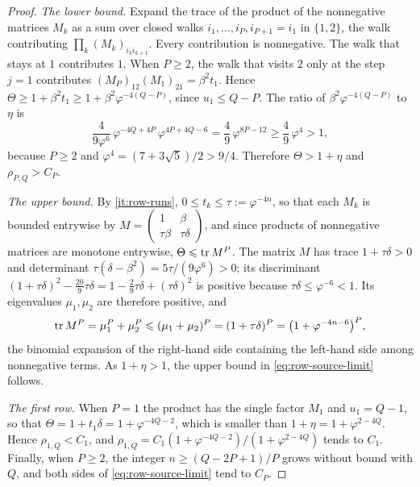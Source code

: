 \begin{proof}
\emph{The lower bound.} Expand the trace of the product of the
nonnegative matrices $M_k$ as a sum over closed walks
$i_1,\dots,i_P,i_{P+1}=i_1$ in $\{1,2\}$, the walk contributing
$\prod_k(M_k)_{i_ki_{k+1}}$. Every contribution is nonnegative. The walk that
stays at $1$ contributes $1$. When $P\geqslant2$, the walk that visits $2$
only at the step $j=1$ contributes $(M_P)_{12}(M_1)_{21}=\beta^2t_1$. Hence
$\Theta\geqslant1+\beta^2t_1\geqslant1+\beta^2\varphi^{-4(Q-P)}$, since $u_1\leqslant Q-P$.
The ratio of $\beta^2\varphi^{-4(Q-P)}$ to $\eta$ is
$$
 \frac{4}{9\varphi^6}\,\varphi^{-4Q+4P}\,\varphi^{4P+4Q-6}
 =\frac49\,\varphi^{8P-12}\geqslant\frac49\,\varphi^4>1 ,
$$
because $P\geqslant2$ and $\varphi^4=(7+3\sqrt5)/2>9/4$. Therefore $\Theta>1+\eta$
and $\rho_{P,Q}>C_P$.

\emph{The upper bound.} By \ref{it:row-runs}, $0\leqslant t_k\leqslant\tau:=\varphi^{-4n}$, so that
each $M_k$ is bounded entrywise by
$M=\left(\begin{smallmatrix}1&\beta\\\tau\beta&\tau\delta\end{smallmatrix}\right)$,
and since products of nonnegative matrices are monotone entrywise,
$\Theta\leqslant\operatorname{tr} M^P$. The matrix $M$ has trace $1+\tau\delta>0$ and determinant
$\tau(\delta-\beta^2)=5\tau/(9\varphi^6)>0$; its discriminant
$(1+\tau\delta)^2-\tfrac{20}{9}\tau\delta=1-\tfrac29\tau\delta+(\tau\delta)^2$ is positive because
$\tau\delta\leqslant\varphi^{-6}<1$.
Its eigenvalues $\mu_1,\mu_2$ are therefore positive, and
$$
 \operatorname{tr} M^P=\mu_1^P+\mu_2^P\leqslant(\mu_1+\mu_2)^P=(1+\tau\delta)^P
 =\bigl(1+\varphi^{-4n-6}\bigr)^P ,
$$
the binomial expansion of the right-hand side containing the left-hand
side among nonnegative terms. As $1+\eta>1$, the upper bound in
\eqref{eq:row-source-limit} follows.

\emph{The first row.} When $P=1$ the product has the single factor $M_1$ and
$u_1=Q-1$, so that $\Theta=1+t_1\delta=1+\varphi^{-4Q-2}$, which is smaller than
$1+\eta=1+\varphi^{2-4Q}$. Hence $\rho_{1,Q}<C_1$, and $\rho_{1,Q}=C_1(1+\varphi^{-4Q-2})/(1+\varphi^{2-4Q})$ tends to
$C_1$. Finally, when $P\geqslant2$, the integer $n\geqslant(Q-2P+1)/P$ grows without bound
with $Q$, and both sides of \eqref{eq:row-source-limit} tend to $C_P$.
\end{proof}

